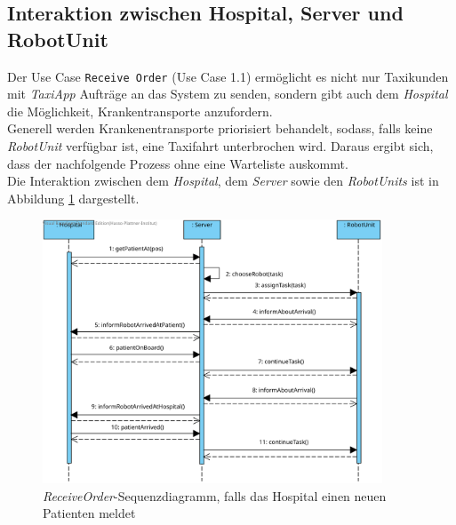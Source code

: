 \subsection*{Interaktion zwischen Hospital, Server und RobotUnit}
Der Use Case \texttt{Receive Order} (Use Case 1.1) ermöglicht es nicht nur Taxikunden mit \emph{TaxiApp} Aufträge an das System zu senden, sondern gibt auch dem \emph{Hospital} die Möglichkeit, Krankentransporte anzufordern. \\
Generell werden Krankenentransporte priorisiert behandelt, sodass, falls keine \emph{RobotUnit} verfügbar ist, eine Taxifahrt unterbrochen wird. Daraus ergibt sich, dass der nachfolgende Prozess ohne eine Warteliste auskommt. \\
Die Interaktion zwischen dem \emph{Hospital}, dem \emph{Server} sowie den \emph{RobotUnits} ist in Abbildung \ref{SequenzDiagrammInteraktionHospital} dargestellt.
\begin{figure}[H]
	\centering
	\includegraphics[width=0.9\textwidth]{img/2-Entwurf-ReceiveOrder-Hosp}
	\caption{\emph{ReceiveOrder}-Sequenzdiagramm, falls das Hospital einen neuen Patienten meldet}
	\label{SequenzDiagrammInteraktionHospital}
\end{figure}


